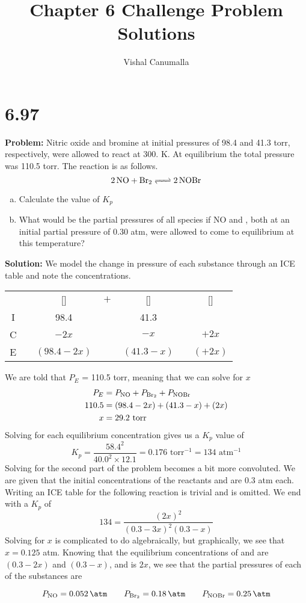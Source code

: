\documentclass[11 pt]{article}
\title{Chapter 6 Challenge Problem Solutions}
\author{Vishal Canumalla}
\makeatletter
\newcommand{\icetable}[9]{
    \begin{tabular}{cc@{}c@{}c@{}c@{}c@{}c}

    & &   [\ce{#2#1}]& ${}+{}$ & [\ce{#4#3}] & \ce{<=>}& [\ce{#6#5}]\\
 
  I & &       #7    &&   #8                      &&  #9    \\
  C & &       $- #2x$    &&   $- #4x$                         &&  $+ #6x$    \\
  E & &       $(#7 - #2x)$    &&   $(#8 - #4x)$                         &&  $(#9 + #6x)$    \\
 
    \end{tabular}


}
\makeatother
\begin{document}
\maketitle

\section*{6.97} 
\begin{boxBool}
  

\textbf{Problem:} Nitric oxide and bromine at initial pressures of 98.4 and 41.3 torr, respectively, were allowed to react at 300. K. At equilibrium the total pressure was 110.5 torr. The reaction is as follows.
$$\ce{2NO + Br2 <=> 2NOBr}$$
\begin{enumerate}[a)]
    \item Calculate the value of $K_p$
    \item What would be the partial pressures of all species if
NO and , both at an initial partial pressure of
0.30 atm, were allowed to come to equilibrium at
this temperature?
\end{enumerate}
\end{boxBool}
\textbf{Solution:} We model the change in pressure of each substance through an ICE table and note the concentrations.
\begin{center}
 \icetable{NO}{2}{Br2}{}{NOBr}{2}{98.4}{41.3}{}
\end{center}
We are told that $P_{E}$ = 110.5 torr, meaning that we can solve for $x$
\begin{align*}
P_E &= P_{\ce{NO}} + P_{\ce{Br2}} + P_{\ce{NOBr}} \\
    110.5 &= (98.4 - 2x) + (41.3 - x) + (2x) \\
    x &= 29.2 \text{ torr}
\end{align*}
Solving for each equilibrium concentration gives us a $K_p$ value of 
$$K_p = \frac{58.4^2}{40.0^2 \times 12.1} = 0.176 \text{ torr}^{-1} = \boxed{134 \text{ atm}^{-1}}$$
Solving for the second part of the problem becomes a bit more convoluted. We are given that the initial concentrations of the reactants  and  are 
0.3 atm each. Writing an ICE table for the following reaction is trivial and is omitted. We end with a $K_p$ of 
$$134 =  \frac{(2x)^2}{(0.3-3x)^2(0.3-x)}$$
Solving for $x$ is complicated to do algebraically, but graphically, we see that $x = 0.125$ atm. Knowing
that the equilibrium concentrations of  and  are $(0.3 - 2x)$ and $(0.3 - x)$, and 
 is $2x$, we see that the partial pressures of each of the substances are
\begin{answer}
  $$ P_{\ce{NO}} = \SI{0.052}{\atm} \qquad P_{\ce{Br2}} = \SI{0.18}{\atm} \qquad P_{\ce{NOBr}} = \SI{0.25}{\atm}$$
\end{answer}
\end{document}
